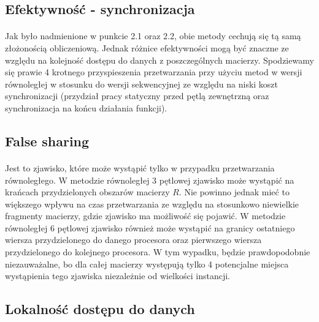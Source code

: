\documentclass{scrartcl}
\begin{document}
\subsection{Efektywność - synchronizacja}
\paragraph{}Jak było nadmienione w punkcie 2.1 oraz 2.2, obie metody cechują się tą samą złożonością obliczeniową. Jednak różnice efektywności mogą być znaczne ze względu na kolejność dostępu do danych z poszczególnych macierzy. Spodziewamy się prawie 4 krotnego przyspieszenia przetwarzania przy użyciu metod w wersji równoległej w stosunku do wersji sekwencyjnej ze względu na niski koszt synchronizacji (przydział pracy statyczny przed pętlą zewnętrzną oraz synchronizacja na końcu działania funkcji).
\subsection{False sharing}
\paragraph{}Jest to zjawisko, które może wystąpić tylko w przypadku przetwarzania równoległego. W metodzie równoległej 3 pętlowej zjawisko może wystąpić na krańcach przydzielonych obszarów macierzy $R$. Nie powinno jednak mieć to większego wpływu na czas przetwarzania ze względu na stosunkowo niewielkie fragmenty macierzy, gdzie zjawisko ma możliwość się pojawić.
W metodzie równoległej 6 pętlowej zjawisko również może wystąpić na granicy ostatniego wiersza przydzielonego do danego procesora oraz pierwszego wiersza przydzielonego do kolejnego procesora. W tym wypadku, będzie prawdopodobnie niezauważalne, bo dla całej macierzy występują tylko 4 potencjalne miejsca wystąpienia tego zjawiska niezależnie od wielkości instancji.
\subsection{Lokalność dostępu do danych}
\end{document}

